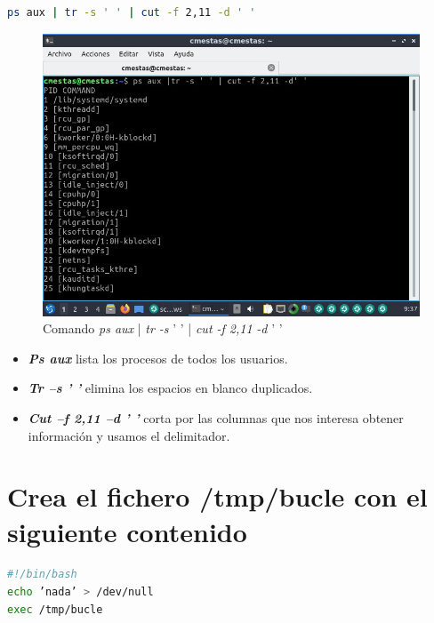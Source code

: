 \documentclass[12pt]{article}
\begin{document}
\begin{lstlisting}[language=bash,frame=single,style=CStyle]
ps aux | tr -s ' ' | cut -f 2,11 -d ' '
\end{lstlisting}

\begin{figure}[h]
    \centering
    \includegraphics[width=1\textwidth]{images/screenA07.jpg}
    \caption{Comando \textit{ps aux} | \textit{tr -s} ' ' | \textit{cut -f 2,11} \textit{-d} ' '}
\end{figure}

\begin{itemize}
    \item \textbf{\textit{Ps aux}} lista los procesos de todos los usuarios.
    \item \textbf{\textit{Tr –s ' '}} elimina los espacios en blanco duplicados.
    \item \textbf{\textit{Cut –f 2,11 –d ' '}} corta por las columnas que nos interesa obtener información y usamos el delimitador.
\end{itemize}

\newpage
\clearpage

\section{Crea el fichero /tmp/bucle con el siguiente contenido}

\begin{lstlisting}[language=bash,frame=single,style=CStyle]
#!/bin/bash
echo ’nada’ > /dev/null 
exec /tmp/bucle
\end{lstlisting}
\end{document}
